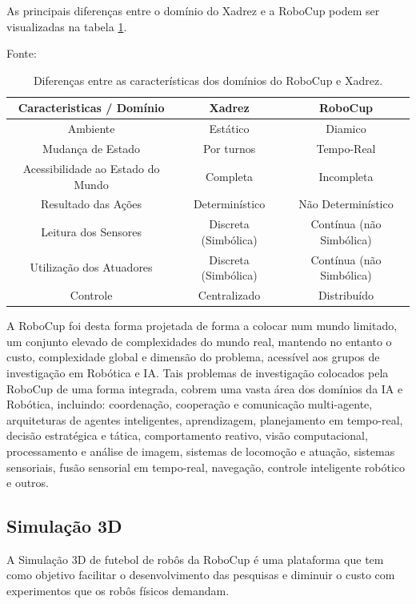 As principais diferenças entre o domínio do Xadrez e a RoboCup podem ser visualizadas na tabela \ref{tab:xadrobocup}.

\begin{table}[!htb]

\centering

\caption{Diferenças entre as características dos domínios do RoboCup e Xadrez.} Fonte: \cite{reisTese} 

  \begin{tabular}{|c|c|c|}

    \hline
    \hline
    Caracteristicas / Domínio & Xadrez & RoboCup \\
    \hline
    Ambiente & Estático & Diamico \\
    \hline
    Mudança de Estado & Por turnos & Tempo-Real \\
    \hline
    Acessibilidade ao Estado do Mundo & Completa & Incompleta \\
    \hline
    Resultado das Ações & Determinístico & Não Determinístico \\
    \hline
    Leitura dos Sensores & Discreta (Simbólica) & Contínua (não Simbólica) \\
    \hline
    Utilização dos Atuadores & Discreta (Simbólica) & Contínua (não Simbólica) \\
    \hline
    Controle & Centralizado & Distribuído \\
    \hline
    \hline
  \end{tabular}

  \label{tab:xadrobocup}
\end{table}

A RoboCup foi desta forma projetada de forma a colocar num mundo limitado, um conjunto elevado de complexidades do mundo real, 
mantendo no entanto o custo, complexidade global e dimensão do problema, acessível aos grupos de investigação em Robótica e 
IA. Tais problemas de investigação colocados pela RoboCup de uma forma integrada, cobrem uma vasta área dos 
domínios da IA e Robótica, incluindo: coordenação, cooperação e comunicação multi-agente, arquiteturas de agentes inteligentes, 
aprendizagem, planejamento em tempo-real, decisão estratégica e tática, comportamento reativo, visão computacional, processamento
e análise de imagem, sistemas de locomoção e atuação, sistemas sensoriais, fusão sensorial em tempo-real, navegação, controle 
inteligente robótico e outros.

\subsection{Simulação 3D}
\label{subsec:simulacao3d}
A Simulação 3D de futebol de robôs da RoboCup é uma plataforma que tem como objetivo facilitar o desenvolvimento das pesquisas e 
diminuir o custo com experimentos que os robôs físicos demandam. 

